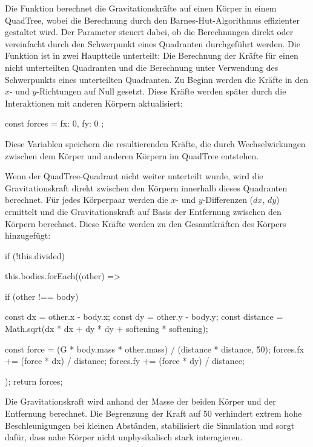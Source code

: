 \documentclass[a4paper,12pt,twoside]{article}
\begin{document}
Die Funktion  berechnet die Gravitationskräfte auf einen Körper  in einem QuadTree, wobei die Berechnung durch den Barnes-Hut-Algorithmus effizienter gestaltet wird. Der Parameter  steuert dabei, ob die Berechnungen direkt oder vereinfacht durch den Schwerpunkt eines Quadranten durchgeführt werden. Die Funktion ist in zwei Hauptteile unterteilt: Die Berechnung der Kräfte für einen nicht unterteilten Quadranten und die Berechnung unter Verwendung des Schwerpunkts eines unterteilten Quadranten.
Zu Beginn werden die Kräfte in den \( x \)- und \( y \)-Richtungen auf Null gesetzt. Diese Kräfte werden später durch die Interaktionen mit anderen Körpern aktualisiert:

\begin{javascript}
const forces = { fx: 0, fy: 0 };
\end{javascript}

Diese Variablen speichern die resultierenden Kräfte, die durch Wechselwirkungen zwischen dem Körper und anderen Körpern im QuadTree entstehen.

Wenn der QuadTree-Quadrant nicht weiter unterteilt wurde, wird die Gravitationskraft direkt zwischen den Körpern innerhalb dieses Quadranten berechnet. Für jedes Körperpaar werden die \( x \)- und \( y \)-Differenzen (\( dx \), \( dy \)) ermittelt und die Gravitationskraft auf Basis der Entfernung zwischen den Körpern berechnet. Diese Kräfte werden zu den Gesamtkräften des Körpers hinzugefügt:

\begin{javascript}
if (!this.divided) {
    this.bodies.forEach((other) => {
        if (other !== body) {
            const dx = other.x - body.x;
            const dy = other.y - body.y;
            const distance = Math.sqrt(dx * dx + dy * dy + softening * softening);
            
            const force = (G * body.mass * other.mass) / (distance * distance, 50);
            forces.fx += (force * dx) / distance;
            forces.fy += (force * dy) / distance;
        }
    });
    return forces;
}
\end{javascript}

Die Gravitationskraft  wird anhand der Masse der beiden Körper und der Entfernung berechnet.
Die Begrenzung der Kraft auf 50 verhindert extrem hohe Beschleunigungen bei kleinen Abständen, stabilisiert die Simulation und sorgt dafür, dass nahe Körper nicht 
unphysikalisch stark interagieren.
\end{document}
